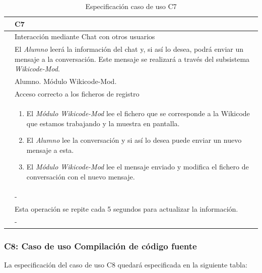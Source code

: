 \begin{table}[h]
\centering
\begin{tabular}{ | p{} | p{} | }
	\hline
	\cellcolor[gray]{.8}{ID} & C7 \\
	\hline 
	\cellcolor[gray]{.8}{Nombre} & Interacción mediante Chat con otros usuarios \\
	\hline
	\cellcolor[gray]{.8}{Descripción} & El \emph{Alumno} leerá la información del chat y, si así lo desea, podrá enviar un mensaje a la conversación. Este mensaje se realizará a través del subsistema \emph{Wikicode-Mod}. \\
	\hline
	\cellcolor[gray]{.8}{Actores} & Alumno. Módulo Wikicode-Mod. \\
	\hline
	\cellcolor[gray]{.8}{Asunciones} & Acceso correcto a los ficheros de registro \\
	\hline
	\cellcolor[gray]{.8}{Pasos} & \begin{enumerate}
		\item El \emph{Módulo Wikicode-Mod} lee el fichero que se corresponde a la Wikicode que estamos trabajando y la muestra en pantalla.  
		\item El \emph{Alumno} lee la conversación y si así lo desea  puede enviar un nuevo mensaje a esta.
		\item El \emph{Módulo Wikicode-Mod} lee el mensaje enviado y modifica el fichero de conversación con el nuevo mensaje.
		\end{enumerate} \\
	\hline
	\cellcolor[gray]{.8}{Variaciones} & - \\
	\hline
	\cellcolor[gray]{.8}{Requisitos no funcionales} & Esta operación se repite cada 5 segundos para actualizar la información. \\
	\hline
	\cellcolor[gray]{.8}{Cuestiones} & - \\
	\hline
	
\end{tabular}
\caption{Especificación caso de uso C7}
\end{table}

\newpage
\subsubsection{C8: Caso de uso Compilación de código fuente}

La especificación del caso de uso C8 quedará especificada en la siguiente tabla:

